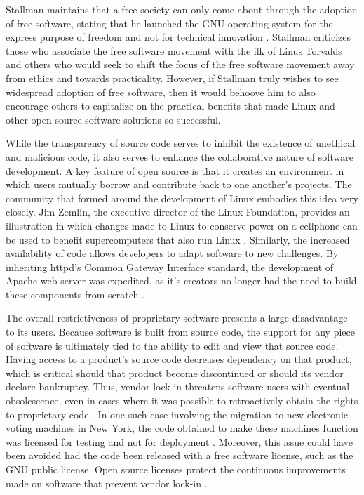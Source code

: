 
Stallman maintains that a free society can only come about through the adoption of free software, stating that he launched the GNU operating system for the express purpose of freedom and not for technical innovation \citeyear[para. 48]{rms2011}.  Stallman criticizes those who associate the free software movement with the ilk of Linus Torvalds and others who would seek to shift the focus of the free software movement away from ethics and towards practicality. However, if Stallman truly wishes to see widespread adoption of free software, then it would behoove him to also encourage others to capitalize on the practical benefits that made Linux and other open source software solutions so successful.
	
While the transparency of source code serves to inhibit the existence of unethical and malicious code, it also serves to enhance the collaborative nature of software development. A key feature of open source is that it creates an environment in which users mutually borrow and contribute back to one another's projects. The community that formed around the development of Linux embodies this idea very closely. Jim Zemlin, the executive director of the Linux Foundation, provides an illustration in which changes made to Linux to conserve power on a cellphone can be used to benefit supercomputers that also run Linux \citeyear[11:34]{zemlin}. Similarly, the increased availability of code allows developers to adapt software to new challenges. By inheriting httpd's Common Gateway Interface standard, the development of Apache web server was expedited, as it's creators no longer had the need to build these components from scratch \citep[p.7]{bisson}. 
	
The overall restrictiveness of proprietary software presents a large disadvantage to its users.  Because software is built from source code, the support for any piece of software is ultimately tied to the ability to edit and view that source code. Having access to a product's source code decreases dependency on that product, which is critical should that product become discontinued or should its vendor declare bankruptcy.  Thus, vendor lock-in threatens software users with eventual obsolescence, even in cases where it was possible to retroactively obtain the rights to proprietary code . In one such case involving the migration to new electronic voting machines in New York, the code obtained to make these machines function was licensed for testing and not for deployment \citep[p. 916]{colannino}. Moreover, this issue could have been avoided had the code been released with a free software license, such as the GNU public license. Open source licenses protect the continuous improvements made on software that prevent vendor lock-in \citep[p. 919]{colannino}.

